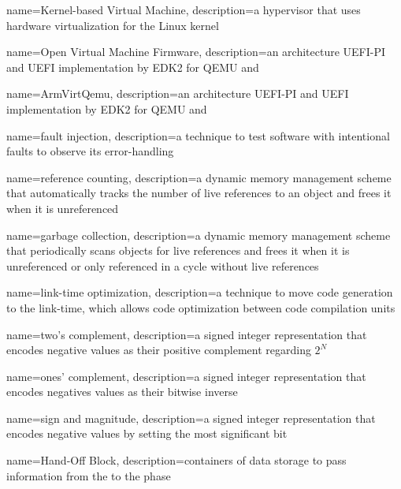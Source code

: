 {
  name={Kernel-based Virtual Machine},
  description={a hypervisor that uses hardware virtualization for the Linux kernel}
}

{
  name={Open Virtual Machine Firmware},
  description={an  architecture \gls{UEFI-PI} and \gls{UEFI} implementation by \gls{EDK2} for QEMU and }
}

{
  name={ArmVirtQemu},
  description={an  architecture \gls{UEFI-PI} and \gls{UEFI} implementation by \gls{EDK2} for QEMU and  }
}

{
  name={fault injection},
  description={a technique to test software with intentional faults to observe its error-handling}
}

{
  name={reference counting},
  description={a dynamic memory management scheme that automatically tracks the number of live references to an object and frees it when it is unreferenced}
}

{
  name={garbage collection},
  description={a dynamic memory management scheme that periodically scans objects for live references and frees it when it is unreferenced or only referenced in a cycle without live references}
}

{
  name={link-time optimization},
  description={a technique to move code generation to the link-time, which allows code optimization between code compilation units}
}

{
  name={two's complement},
  description={a signed integer representation that encodes negative values as their positive complement regarding $2^N$}
}

{
  name={ones' complement},
  description={a signed integer representation that encodes negatives values as their bitwise inverse}
}

{
  name={sign and magnitude},
  description={a signed integer representation that encodes negative values by setting the most significant bit}
}

{
  name={Hand-Off Block},
  description={containers of data storage to pass information from the  to the  phase}
}
